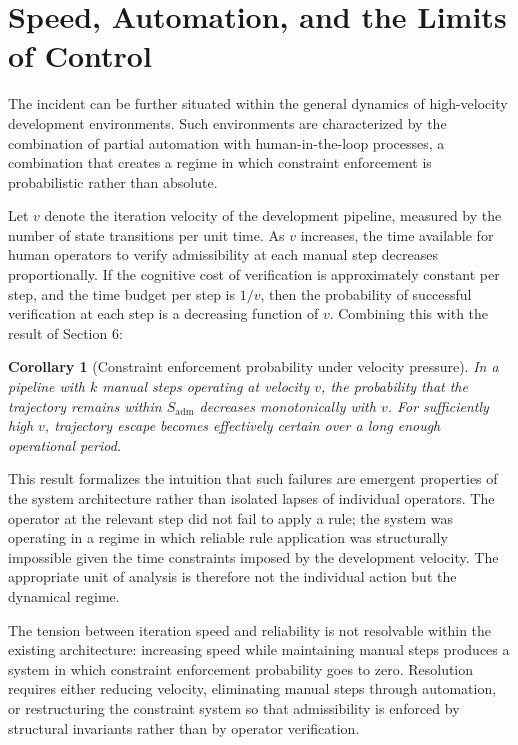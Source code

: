 \documentclass[12pt, oneside]{article}
\theoremstyle{plain}
\newtheorem{corollary}[theorem]{Corollary}
\theoremstyle{definition}
\theoremstyle{remark}
\begin{document}
\section{Speed, Automation, and the Limits of Control}

The incident can be further situated within the general dynamics of high-velocity development
environments. Such environments are characterized by the combination of partial automation
with human-in-the-loop processes, a combination that creates a regime in which constraint
enforcement is probabilistic rather than absolute.

Let $v$ denote the iteration velocity of the development pipeline, measured by the number
of state transitions per unit time. As $v$ increases, the time available for human
operators to verify admissibility at each manual step decreases proportionally. If the
cognitive cost of verification is approximately constant per step, and the time budget per
step is $1/v$, then the probability of successful verification at each step is a decreasing
function of $v$. Combining this with the result of Section 6:

\begin{corollary}[Constraint enforcement probability under velocity pressure]
In a pipeline with $k$ manual steps operating at velocity $v$, the probability that the
trajectory remains within $S_{\text{adm}}$ decreases monotonically with $v$. For sufficiently
high $v$, trajectory escape becomes effectively certain over a long enough operational period.
\end{corollary}

This result formalizes the intuition that such failures are emergent properties of the
system architecture rather than isolated lapses of individual operators. The operator at
the relevant step did not fail to apply a rule; the system was operating in a regime in
which reliable rule application was structurally impossible given the time constraints
imposed by the development velocity. The appropriate unit of analysis is therefore not the
individual action but the dynamical regime.

The tension between iteration speed and reliability is not resolvable within the existing
architecture: increasing speed while maintaining manual steps produces a system in which
constraint enforcement probability goes to zero. Resolution requires either reducing velocity,
eliminating manual steps through automation, or restructuring the constraint system so that
admissibility is enforced by structural invariants rather than by operator verification.
\end{document}

